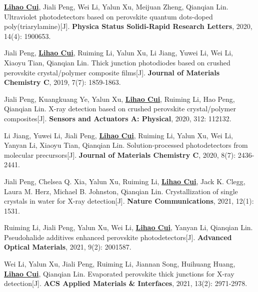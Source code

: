 ﻿%


\reseachresult

\begin{enumerate}[{[1]}]
\item  \textbf{\underline{Lihao Cui}}, Jiali Peng, Wei Li, Yalun Xu, Meijuan Zheng, Qianqian Lin. Ultraviolet photodetectors based on  perovskite quantum dots-doped poly(triarylamine)[J]. \textbf{Physica Status Solidi-Rapid Research Letters}, 2020, 14(4): 1900653.

\item Jiali Peng, \textbf{\underline{Lihao Cui}}, Ruiming Li, Yalun Xu, Li Jiang, Yuwei Li, Wei Li, Xiaoyu Tian, Qianqian Lin. Thick junction photodiodes based on crushed perovskite crystal/polymer composite films[J]. \textbf{Journal of Materials Chemistry C}, 2019, 7(7): 1859-1863.

\item Jiali Peng, Kuangkuang Ye, Yalun Xu, \textbf{\underline{Lihao Cui}}, Ruiming Li, Hao Peng, Qianqian Lin. X-ray detection based on crushed perovskite crystal/polymer composites[J]. \textbf{Sensors and Actuators A: Physical}, 2020, 312: 112132.

\item	Li Jiang, Yuwei Li, Jiali Peng, \textbf{\underline{Lihao Cui}}, Ruiming Li, Yalun Xu, Wei Li, Yanyan Li, Xiaoyu Tian, Qianqian Lin. Solution-processed  photodetectors from molecular precursors[J]. \textbf{Journal of Materials Chemistry C}, 2020, 8(7): 2436-2441.

\item Jiali Peng, Chelsea Q. Xia, Yalun Xu, Ruiming Li, \textbf{\underline{Lihao Cui}}, Jack K. Clegg, Laura M. Herz, Michael B. Johnston, Qianqian Lin. Crystallization of  single crystals in water for X-ray detection[J]. \textbf{Nature Communications}, 2021, 12(1): 1531.

\item	Ruiming Li, Jiali Peng, Yalun Xu, Wei Li, \textbf{\underline{Lihao Cui}}, Yanyan Li, Qianqian Lin. Pseudohalide additives enhanced perovskite photodetectors[J]. \textbf{Advanced Optical Materials}, 2021, 9(2): 2001587.

\item	Wei Li, Yalun Xu, Jiali Peng, Ruiming Li, Jiannan Song, Huihuang Huang, \textbf{\underline{Lihao Cui}}, Qianqian Lin. Evaporated perovskite thick junctions for X-ray detection[J]. \textbf{ACS Applied Materials \& Interfaces}, 2021, 13(2): 2971-2978.


\end{enumerate}
